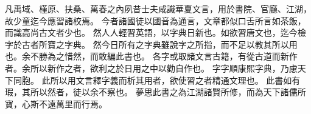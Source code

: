 凡禹域、槿原、扶桑、萬春之內夙昔士夫咸識華夏文言，用於書院、官廳、江湖，故少童迄今應習諸校焉。
今者諸國徒以國音為通言，文章都似口舌所言如茶飯，而識高尚古文者少也。
然人人輕習英語，以字典日新也。如欲習唐文也，迄今檢字於古者所寶之字典。
然今日所有之字典雖說字之所指，而不足以教其所以用也。余不勝為之惜然，而敢編此書也。
各字或取諸文言古籍，有從古道而新作者。余所以新作之者，欲利之於日用之中以勸自作也。
字字順康熙字典，乃慮天下同胞。
此所以用文言釋字義而析其用者，欲使習之者精通文理也。
此書如有瑕，其所以然者，徒以余不察也。
夢思此書之為江湖諸賢所修，而為天下諸儒所寶，心斯不遠萬里而行焉。
